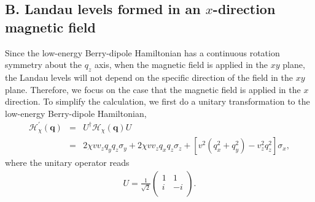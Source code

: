 \documentclass[aps,prl,twocolumn,longbibliography]{revtex4-1}
\newcommand{\bq}{\boldsymbol q}
\begin{document}
\begin{widetext}
\subsection{B. Landau levels formed in an $x$-direction magnetic field}

Since the low-energy Berry-dipole Hamiltonian has a continuous rotation symmetry about the $q_{z}$ axis, when the magnetic field
is applied in the $xy$ plane, the Landau levels will
not depend on the specific direction of the field in the $xy$ plane. Therefore, we focus on the case that the magnetic
field is applied in the $x$ direction. To simplify the calculation, we first do a unitary transformation to the
low-energy Berry-dipole Hamiltonian,
\begin{eqnarray}
	\mathcal{H}_{\chi}^{'}(\bq)&=&U^{\dagger}\mathcal{H}_{\chi}(\bq)U\nonumber\\
	&=&2\chi vv_{z}q_{y}q_{z}\sigma_{y}+2\chi vv_{z}q_{x}q_{z}\sigma_{z}+\left[v^{2}(q_{x}^{2}+q_{y}^{2})-v_{z}^{2}q_{z}^{2}\right]\sigma_{x},\label{xHamiltonian}
\end{eqnarray}
where the unitary operator reads
\begin{eqnarray}
	U=\frac{1}{\sqrt{2}}\left(\begin{array}{cc}
		1 & 1\\
		i & -i\\
	\end{array}\right).
\end{eqnarray}


\end{widetext}
\end{document}

